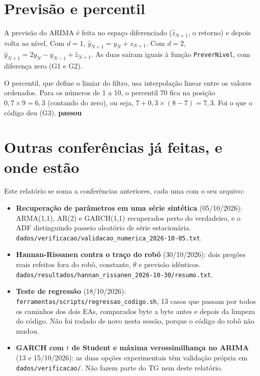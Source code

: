 \documentclass[11pt,a4paper]{article}
\newcommand{\ok}{\textcolor{cok}{\textbf{passou}}}
\begin{document}
\section{Previsão e percentil}

A previsão do ARIMA é feita no espaço diferenciado ($\hat z_{N+1}$, o retorno) e depois volta ao nível. Com
$d = 1$, $\hat y_{N+1} = y_N + \hat z_{N+1}$. Com $d = 2$, $\hat y_{N+1} = 2y_N - y_{N-1} + \hat z_{N+1}$. As duas
saíram iguais à função \texttt{PreverNivel}, com diferença zero (G1 e G2).

O percentil, que define o limiar do filtro, usa interpolação linear entre os valores ordenados. Para os números
de 1 a 10, o percentil 70 fica na posição $0{,}7 \times 9 = 6{,}3$ (contando do zero), ou seja, $7 + 0{,}3 \times
(8 - 7) = 7{,}3$. Foi o que o código deu (G3). \ok

\section{Outras conferências já feitas, e onde estão}

Este relatório se soma a conferências anteriores, cada uma com o seu arquivo:

\begin{itemize}[leftmargin=1.2em]
\item \textbf{Recuperação de parâmetros em uma série sintética} (05/10/2026): ARMA(1,1), AR(2) e GARCH(1,1)
recuperados perto do verdadeiro, e o ADF distinguindo passeio aleatório de série estacionária.
\nolinkurl{dados/verificacao/validacao_numerica_2026-10-05.txt}.
\item \textbf{Hannan-Rissanen contra o traço do robô} (30/10/2026): dois pregões reais refeitos fora do robô,
constante, $\theta$ e previsão idênticos. \nolinkurl{dados/resultados/hannan_rissanen_2026-10-30/resumo.txt}.
\item \textbf{Teste de regressão} (18/10/2026): \texttt{ferramentas/scripts/regressao\_codigo.sh}, 13 casos que
passam por todos os caminhos dos dois EAs, comparados byte a byte antes e depois da limpeza do código. Não foi
rodado de novo nesta sessão, porque o código do robô não mudou.
\item \textbf{GARCH com $t$ de Student e máxima verossimilhança no ARIMA} (13 e 15/10/2026): as duas opções
experimentais têm validação própria em \nolinkurl{dados/verificacao/}. Não fazem parte do TG nem deste relatório.
\end{itemize}
\end{document}
